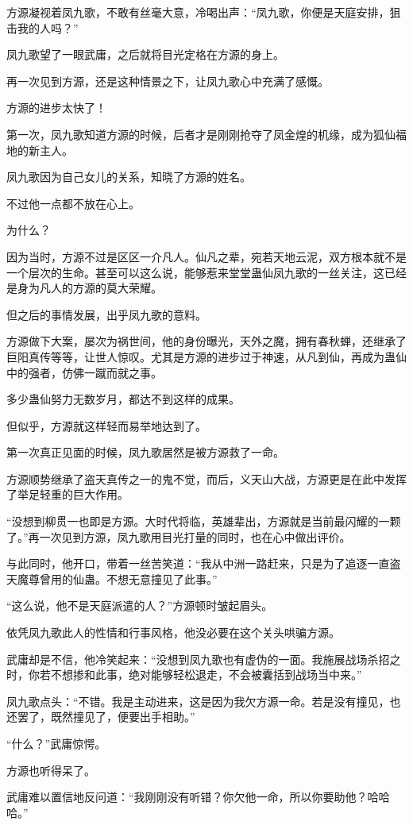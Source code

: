 \begin{this_body}
方源凝视着凤九歌，不敢有丝毫大意，冷喝出声：“凤九歌，你便是天庭安排，狙击我的人吗？”

凤九歌望了一眼武庸，之后就将目光定格在方源的身上。

再一次见到方源，还是这种情景之下，让凤九歌心中充满了感慨。

方源的进步太快了！

第一次，凤九歌知道方源的时候，后者才是刚刚抢夺了凤金煌的机缘，成为狐仙福地的新主人。

凤九歌因为自己女儿的关系，知晓了方源的姓名。

不过他一点都不放在心上。

为什么？

因为当时，方源不过是区区一介凡人。仙凡之辈，宛若天地云泥，双方根本就不是一个层次的生命。甚至可以这么说，能够惹来堂堂蛊仙凤九歌的一丝关注，这已经是身为凡人的方源的莫大荣耀。

但之后的事情发展，出乎凤九歌的意料。

方源做下大案，屡次为祸世间，他的身份曝光，天外之魔，拥有春秋蝉，还继承了巨阳真传等等，让世人惊叹。尤其是方源的进步过于神速，从凡到仙，再成为蛊仙中的强者，仿佛一蹴而就之事。

多少蛊仙努力无数岁月，都达不到这样的成果。

但似乎，方源就这样轻而易举地达到了。

第一次真正见面的时候，凤九歌居然是被方源救了一命。

方源顺势继承了盗天真传之一的鬼不觉，而后，义天山大战，方源更是在此中发挥了举足轻重的巨大作用。

“没想到柳贯一也即是方源。大时代将临，英雄辈出，方源就是当前最闪耀的一颗了。”再一次见到方源，凤九歌用目光打量的同时，也在心中做出评价。

与此同时，他开口，带着一丝苦笑道：“我从中洲一路赶来，只是为了追逐一直盗天魔尊曾用的仙蛊。不想无意撞见了此事。”

“这么说，他不是天庭派遣的人？”方源顿时皱起眉头。

依凭凤九歌此人的性情和行事风格，他没必要在这个关头哄骗方源。

武庸却是不信，他冷笑起来：“没想到凤九歌也有虚伪的一面。我施展战场杀招之时，你若不想掺和此事，绝对能够轻松退走，不会被囊括到战场当中来。”

凤九歌点头：“不错。我是主动进来，这是因为我欠方源一命。若是没有撞见，也还罢了，既然撞见了，便要出手相助。”

“什么？”武庸惊愕。

方源也听得呆了。

武庸难以置信地反问道：“我刚刚没有听错？你欠他一命，所以你要助他？哈哈哈。”


\end{this_body}
